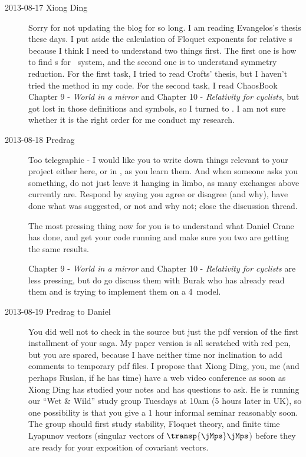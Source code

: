 \begin{description}
\item[2013-08-17 Xiong Ding]
Sorry for not updating the blog for so long. I am reading Evangelos's thesis
these days. I put aside the calculation of Floquet exponents for relative \po s
because I think I need to understand two things first. The first one is how to find
\po s for \KS\ system, and the second one is to understand symmetry reduction.
For the first task, I tried to read Crofts' thesis,
but I haven't tried the method in my code.
For the second task, I read ChaosBook
 {Chapter
    9} - {\em World in a mirror}
 and
 {Chapter 10} - {\em Relativity for cyclists},
but got lost in those definitions
and symbols, so I turned to .
I am not sure whether it is
the right order for me conduct my research.

\item[2013-08-18 Predrag] Too telegraphic - I would like you to write down
things relevant to
your project  either here, or in , as you learn them.
And when someone asks you something, do not just leave it hanging
in limbo, as many exchanges
above currently are. Respond by saying you agree or disagree (and why), have done
what was suggested, or not and why not; close the discussion thread.


The most pressing thing now for you is to understand what Daniel Crane has done,
and get your code running and make sure you two are getting the same results.

 {Chapter
    9} - {\em World in a mirror}
 and
 {Chapter 10} - {\em Relativity for cyclists} are less pressing, but
do go discuss them with Burak who has already read them and is
trying to implement them on a 4\dmn\ model.

\item[2013-08-19 Predrag to Daniel] You did well not to check in the source
but just the pdf version of the
 {first installment} of your saga. My paper
version is all scratched with red pen, but you are spared, because I have neither
time nor inclination to add comments to temporary pdf files. I propose that
Xiong Ding, you, me (and perhaps Ruslan, if he has time) have a web video conference
as soon as Xiong Ding has studied your notes and has questions to ask. He is
running our ``Wet \& Wild'' study group Tuesdays at 10am (5 hours later in UK),
so one possibility is that you give a 1 hour informal seminar reasonably soon.
The group should first study stability, Floquet theory, and finite time
Lyapunov vectors (singular vectors of $\transp{\jMps}\jMps$) before they are ready for your
exposition of covariant vectors.


\end{description}
